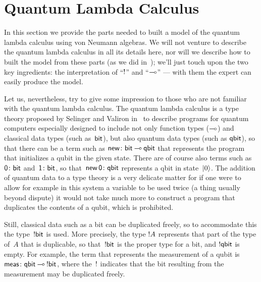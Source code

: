 \documentclass[a]{subfiles}
\begin{document}
\section{Quantum Lambda Calculus}
\label{S:model}
\begin{parsec}%
\begin{point}%
In this section we provide
the parts needed
to built a model
of the quantum lambda calculus
using von Neumann algebras.
We will not venture
to describe the quantum lambda calculus
in all its details here,
nor will we describe how to built the model
from these parts
(as we did in~\cite{model});
we'll just touch upon
the two key ingredients:
the interpretation of ``$\mathord{!}$'' and ``$\mathbin{\multimap}$''
---
with them the expert
can easily produce the model.

Let us, nevertheless, try to give some impression to those who are not familiar 
with the quantum lambda calculus.
The quantum lambda calculus is a type theory
proposed by Selinger and Valiron in~\cite{selinger2005,selinger2006}
to describe programs for quantum computers
especially designed
to include 
not only
function types ($\mathbin{\multimap}$)
and
classical data types (such as~$\mathsf{bit}$),
but also quantum data types
(such as $\mathsf{qbit}$),
so that there can be a term such as
$\mathsf{new}\colon \mathsf{bit}\mathbin{\multimap} \mathsf{qbit}$
that represents the program
that initializes a qubit in the given state.
There are of course also terms
such as
$\mathsf{0}\colon \mathsf{bit}$
and~$\mathsf{1}\colon \mathsf{bit}$,
so that~$\mathsf{new}\,\mathsf{0}\colon \mathsf{qbit}$
represents a qbit in state~$\ket{0}$.
The addition of quantum data 
to a type theory
is a very delicate matter
for if one were to allow
for example
in this system
a variable to be used twice
(a thing usually beyond dispute)
it would not take much more
to construct
a program
that duplicates the contents
of a qubit,
which is prohibited.

Still, classical data
such as a bit
can be duplicated freely,
so to accommodate this 
the type~$\mathord{!} \mathsf{bit}$ is used.
More precisely,
the type
$\mathord{!} A$
represents that part of the type of~$A$ that is duplicable,
so that~$\mathord{!} \mathsf{bit}$
is the proper type for a bit,
and $\mathord{!}\mathsf{qbit}$ is empty.
For example,
the term that represents the measurement
of a qubit is~$\mathsf{meas}\colon \mathsf{qbit}\mathbin{\multimap} \mathord{!}\mathsf{bit}$,
where the~$\mathord{!}$ indicates that the bit resulting from the measurement
may be duplicated freely.


\end{point}
\end{parsec}
\end{document}
